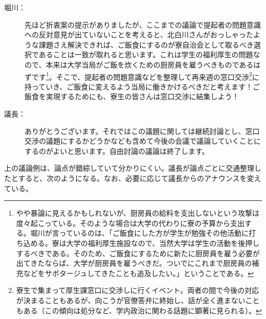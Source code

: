 \begin{description}
\begin{description}
\item[堀川：]先ほど折衷案の提示がありましたが、ここまでの議論で提起者の問題意識への反対意見が出ていないことを考えると、北白川さんがおっしゃったような課題さえ解決できれば、ご飯食にするのが寮自治会として取るべき選択であることは一致が取れると思います。これは学生の福利厚生の問題なので、本来は大学当局がご飯を炊くための厨房員を雇うべきものであるはずです\footnote{やや暴論に見えるかもしれないが、厨房員の給料を支出しないという攻撃は度々起こっている。そのような場合は大学の代わりに寮の予算から支出する。堀川が言っているのは、「ご飯食にした方が学生が勉強その他活動に打ち込める。寮は大学の福利厚生施設なので、当然大学は学生の活動を後押しするべきである。そのため、ご飯食にするために新たに厨房員を雇う必要が出てきたならば、大学が厨房員を雇うべきだ。ついでにこれまで厨房員の補充などをサボタージュしてきたことも追及したい。」ということである。}。そこで、提起者の問題意識などを整理して再来週の窓口交渉\footnote{寮生で集まって厚生課窓口に交渉しに行くイベント。両者の間で今後の対応が決まることもあるが、向こうが官僚答弁に終始し、話が全く進まないこともある（この傾向は処分など、学内政治に関わる話題に顕著に見られる）。}に持っていき、ご飯食に変えるよう当局に働きかけるべきだと考えます！ご飯食を実現するためにも、寮生の皆さんは窓口交渉に結集しよう！
\item[議長：]ありがとうございます。それではこの議題に関しては継続討論とし、窓口交渉の議題にするかどうかなども含めて今後の会議で議論していくことにするのがよいと思います。自由討論の議論は終了します。
  \end{description}
\end{description}
上の議論例は、論点が錯綜していて分かりにくい。議長が論点ごとに交通整理したとすると、次のようになる。なお、必要に応じて議長からのアナウンスを変えている。
